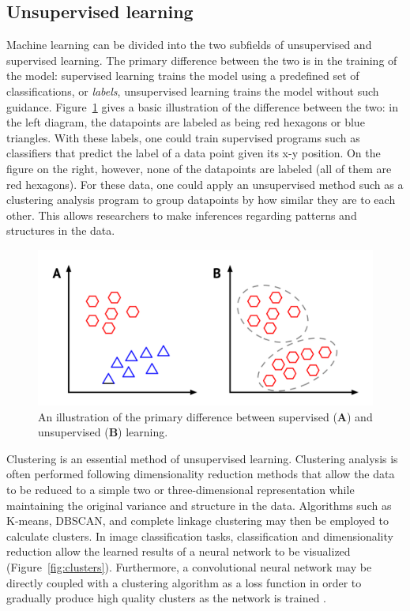 \documentclass[12pt,oneside,onecolumn,a4paper]{article}
\begin{document}
\subsection{Unsupervised learning}

Machine learning can be divided into the two subfields of unsupervised and supervised learning. The primary difference between the two is in the training of the model: supervised learning trains the model using a predefined set of classifications, or \textit{labels}, unsupervised learning trains the model without such guidance. Figure~\ref{fig:super} gives a basic illustration of the difference between the two:
in the left diagram, the datapoints are labeled as being red hexagons or blue triangles. With these labels, one could train supervised programs such as classifiers that predict the label of a data point given its x-y position. On the figure on the right, however, none of the datapoints are labeled (all of them are red hexagons). For these data, one could apply an unsupervised method such as a clustering analysis program to group datapoints by how similar they are to each other. This allows researchers to make inferences regarding patterns and structures in the data.

\begin{figure}[H]
\begin{center}
\includegraphics[width=0.8\columnwidth]{figures/learningtypes}
\caption{An illustration of the primary difference between supervised (\textbf{A}) and unsupervised (\textbf{B}) learning.\label{fig:super}
}
\end{center}
\end{figure}

Clustering is an essential method of unsupervised learning. Clustering analysis is often performed following dimensionality reduction methods that allow the data to be reduced to a simple two or three-dimensional representation while maintaining the original variance and structure in the data. Algorithms such as K-means, DBSCAN, and complete linkage clustering may then be employed to calculate clusters. In image classification tasks, classification and dimensionality reduction allow the learned results of a neural network to be visualized (Figure~\ref{fig:clusters}). Furthermore, a convolutional neural network may be directly coupled with a clustering algorithm as a loss function in order to gradually produce high quality clusters as the network is trained \citep{yangCVPR2016joint}.
\end{document}
